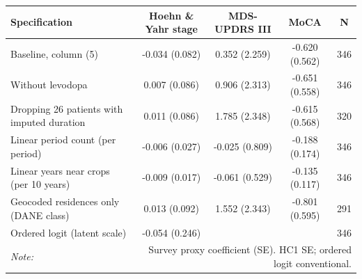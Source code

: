 \begin{tabular}{lcccc}
\hline\hline
Specification & Hoehn \& Yahr stage & MDS-UPDRS III & MoCA & N \\
\hline
Baseline, column (5) & -0.034 (0.082) & 0.352 (2.259) & -0.620 (0.562) & 346 \\
Without levodopa & 0.007 (0.086) & 0.906 (2.313) & -0.651 (0.558) & 346 \\
Dropping 26 patients with imputed duration & 0.011 (0.086) & 1.785 (2.348) & -0.615 (0.568) & 320 \\
Linear period count (per period) & -0.006 (0.027) & -0.025 (0.809) & -0.188 (0.174) & 346 \\
Linear years near crops (per 10 years) & -0.009 (0.017) & -0.061 (0.529) & -0.135 (0.117) & 346 \\
Geocoded residences only (DANE class) & 0.013 (0.092) & 1.552 (2.343) & -0.801 (0.595) & 291 \\
Ordered logit (latent scale) & -0.054 (0.246) &  &  & 346 \\
\hline\hline
\textit{Note:} & \multicolumn{4}{r}{Survey proxy coefficient (SE). HC1 SE; ordered logit conventional.} \\
\end{tabular}
